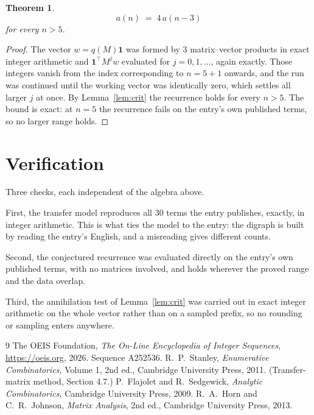 \documentclass[11pt,a4paper]{article}
\theoremstyle{plain}
\newtheorem{theorem}{Theorem}
\theoremstyle{definition}
\begin{document}
\begin{theorem}
\[
a(n)\;=\;4\,a(n-3)
\]
for every $n>5$.
\end{theorem}

\begin{proof}
The vector $w=q(M)\mathbf{1}$ was formed by $3$ matrix--vector products in exact
integer arithmetic and $\mathbf{1}^{\!\top}M^{j}w$ evaluated for $j=0,1,\dots$, again
exactly. Those integers vanish from the index corresponding to $n=5+1$ onwards, and the
run was continued until the working vector was identically zero, which settles all larger $j$
at once. By Lemma~\ref{lem:crit} the recurrence holds for every $n>5$. The bound is exact: at $n=5$ the recurrence fails on the entry's own published terms, so no larger range holds.
\end{proof}

\section{Verification}

Three checks, each independent of the algebra above.

First, the transfer model reproduces all $30$ terms the entry publishes, exactly, in
integer arithmetic. This is what ties the model to the entry: the digraph is built by reading
the entry's English, and a misreading gives different counts.

Second, the conjectured recurrence was evaluated directly on the entry's own published terms,
with no matrices involved, and holds wherever the proved range and the data overlap.

Third, the annihilation test of Lemma~\ref{lem:crit} was carried out in exact integer
arithmetic on the whole vector rather than on a sampled prefix, so no rounding or sampling
enters anywhere.

\begin{thebibliography}{9}
 The OEIS Foundation, \emph{The On-Line Encyclopedia of Integer
Sequences}, \url{https://oeis.org}, 2026. Sequence A252536.
 R.~P.~Stanley, \emph{Enumerative Combinatorics}, Volume 1, 2nd ed.,
Cambridge University Press, 2011. (Transfer-matrix method, Section 4.7.)
 P.~Flajolet and R.~Sedgewick, \emph{Analytic Combinatorics}, Cambridge
University Press, 2009.
 R.~A.~Horn and C.~R.~Johnson, \emph{Matrix Analysis}, 2nd ed., Cambridge
University Press, 2013.
\end{thebibliography}
\end{document}
